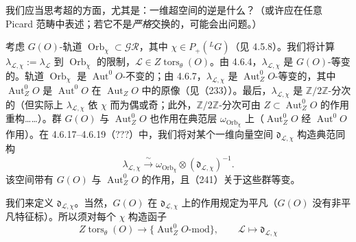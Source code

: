  我们应当思考超的方面，尤其是：一维超空间的逆是什么？（或许应在任意 Picard 范畴中表述；若它不是\emph{严格}交换的，可能会出问题。）

考虑 $G(O)$-轨道 $\operatorname{Orb}_\chi\subset\mathcal{GR}$，其中 $\chi\in P_+({}^{L}G)$（见 4.5.8）。我们将计算 $\lambda_{\mathcal{L},\chi}:=\lambda_{\mathcal{L}}$ 到 $\operatorname{Orb}_\chi$ 的限制，$\mathcal{L}\in Z\operatorname{tors}_\theta(O)$。由 4.6.4，$\lambda_{\mathcal{L},\chi}$ 是 $G(O)$-等变的。轨道 $\operatorname{Orb}_\chi$ 是 $\operatorname{Aut}^0 O$-不变的；由 4.6.7，$\lambda_{\mathcal{L},\chi}$ 是 $\operatorname{Aut}^0_Z O$-等变的，其中 $\operatorname{Aut}^0_Z O$ 是 $\operatorname{Aut}^0 O$ 在 $\operatorname{Aut}_Z O$ 中的原像（见（233））。最后，$\lambda_{\mathcal{L},\chi}$ 是 $\mathbb{Z}/2\mathbb{Z}$-分次的（但实际上 $\lambda_{\mathcal{L},\chi}$ 依 $\chi$ 而为偶或奇；此外，$\mathbb{Z}/2\mathbb{Z}$-分次可由 $Z\subset\operatorname{Aut}^0_Z O$ 的作用重构……）。群 $G(O)$ 与 $\operatorname{Aut}^0_Z O$ 也作用在典范层 $\omega_{\operatorname{Orb}_\chi}$ 上（$\operatorname{Aut}^0_Z O$ 经 $\operatorname{Aut}^0 O$ 作用）。在 4.6.17--4.6.19（???）中，我们将对某个一维向量空间 $\mathfrak{d}_{\mathcal{L},\chi}$ 构造典范同构
\begin{equation}\tag{241}
\lambda_{\mathcal{L},\chi}\xrightarrow{\ \sim\ }\omega_{\operatorname{Orb}_\chi}\otimes(\mathfrak{d}_{\mathcal{L},\chi})^{-1}.
\end{equation}
该空间带有 $G(O)$ 与 $\operatorname{Aut}^0_Z O$ 的作用，且（241）关于这些群等变。

 我们来定义 $\mathfrak{d}_{\mathcal{L},\chi}$。当然，$G(O)$ 在 $\mathfrak{d}_{\mathcal{L},\chi}$ 上的作用规定为平凡（$G(O)$ 没有非平凡特征标）。所以须对每个 $\chi$ 构造函子
\begin{equation}\tag{242}
Z\operatorname{tors}_\theta(O)\to\{\operatorname{Aut}^0_Z O\text{-mod}\},\qquad \mathcal{L}\mapsto\mathfrak{d}_{\mathcal{L},\chi}
\end{equation}


